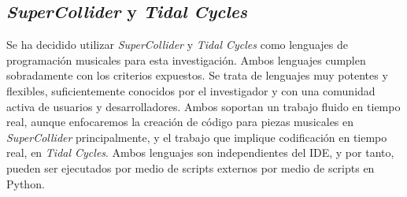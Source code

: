 \subsection{\textit{SuperCollider} y \textit{Tidal Cycles}}
Se ha decidido utilizar \textit{SuperCollider} y \textit{Tidal Cycles} como lenguajes de programación musicales para esta investigación. Ambos lenguajes cumplen sobradamente con los criterios expuestos. Se trata de lenguajes muy potentes y flexibles, suficientemente conocidos por el investigador y con una comunidad activa de usuarios y desarrolladores. Ambos soportan un trabajo fluido en tiempo real, aunque enfocaremos la creación de código para piezas musicales en \textit{SuperCollider} principalmente, y el trabajo que implique codificación en tiempo real, en \textit{Tidal Cycles}. Ambos lenguajes son independientes del IDE, y por tanto, pueden ser ejecutados por medio de scripts externos por medio de scripts en Python. 



